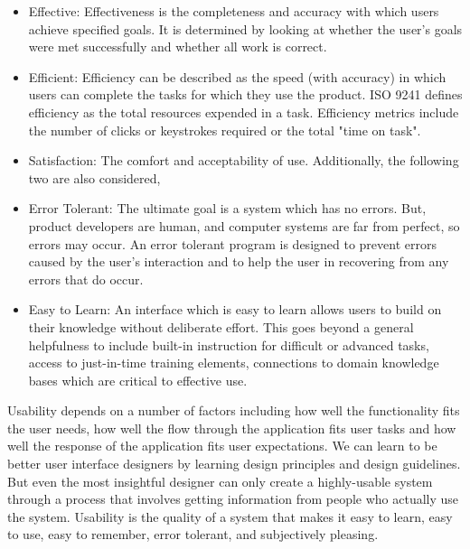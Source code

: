 \begin{itemize}

\item Effective: Effectiveness is the completeness and accuracy with which users achieve specified goals. It is determined by looking at whether the user's goals were met successfully and whether all work is correct.

\item Efficient: Efficiency can be described as the speed (with accuracy) in which users can complete the tasks for which they use the product. ISO 9241 defines efficiency as the total resources expended in a task. Efficiency metrics include the number of clicks or keystrokes required or the total "time on task".

\item Satisfaction: The comfort and acceptability of use. Additionally, the following two are also considered,

\item Error Tolerant: The ultimate goal is a system which has no errors. But, product developers are human, and computer systems are far from perfect, so errors may occur. An error tolerant program is designed to prevent errors caused by the user's interaction and to help the user in recovering from any errors that do occur.

\item Easy to Learn: An interface which is easy to learn allows users to build on their knowledge without deliberate effort. This goes beyond a general helpfulness to include built-in instruction for difficult or advanced tasks, access to just-in-time training elements, connections to domain knowledge bases which are critical to effective use.

\end{itemize}

Usability depends on a number of factors including how well the functionality fits the user needs, how well the flow through the application fits user tasks and how well the response of the application fits user expectations. We can learn to be better user interface designers by learning design principles and design guidelines. But even the most insightful designer can only create a highly-usable system through a process that involves getting information from people who actually use the system. Usability is the quality of a system that makes it easy to learn, easy to use, easy to remember, error tolerant, and subjectively pleasing.

\smallskip

